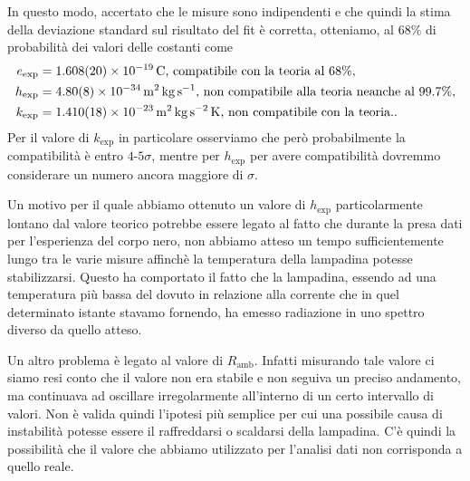 \documentclass[a4paper, varvw, nofootinbib]{revtex4-2}
\begin{document}
In questo modo, accertato che le misure sono indipendenti e che quindi la stima della deviazione standard sul risultato del fit è corretta, otteniamo, al $68\%$ di probabilità dei valori delle costanti come \[
    \begin{aligned}
        e_\text{exp} &= \SI{1.608 +- 0.020 e-19}{\coulomb}\text{, compatibile con la teoria al $68\%$},\\
        h_\text{exp} &= \SI{4.80 +- 0.08 e-34}{\metre\squared\kilo\gram\per\second}\text{, non compatibile alla teoria neanche al 99.7\%},\\
        k_\text{exp} &= \SI{1.410 +- 0.018 e-23}{\metre\squared\kilo\gram\per\second\squared\kelvin}\text{, non compatibile con la teoria.}.
    \end{aligned}
\] Per il valore di $k_\text{exp}$ in particolare osserviamo che però probabilmente la compatibilità è entro $4$-$5\sigma$, mentre per $h_\text{exp}$ per avere compatibilità dovremmo considerare un numero ancora maggiore di $\sigma$. 

Un motivo per il quale abbiamo ottenuto un valore di $h_\text{exp}$ particolarmente lontano dal valore teorico potrebbe essere legato al fatto che durante la presa dati per l'esperienza del corpo nero, non abbiamo atteso un tempo sufficientemente lungo tra le varie misure affinchè la temperatura della lampadina potesse stabilizzarsi. Questo ha comportato il fatto che la lampadina, essendo ad una temperatura più bassa del dovuto in relazione alla corrente che in quel determinato istante stavamo fornendo, ha emesso radiazione in uno spettro diverso da quello atteso.

Un altro problema è legato al valore di $R_\text{amb}$. Infatti misurando tale valore ci siamo resi conto che il valore non era stabile e non seguiva un preciso andamento, ma continuava ad oscillare irregolarmente all'interno di un certo intervallo di valori. Non è valida quindi l'ipotesi più semplice per cui una possibile causa di instabilità potesse essere il raffreddarsi o scaldarsi della lampadina. C'è quindi la possibilità che il valore che abbiamo utilizzato per l'analisi dati non corrisponda a quello reale. 
\end{document}

